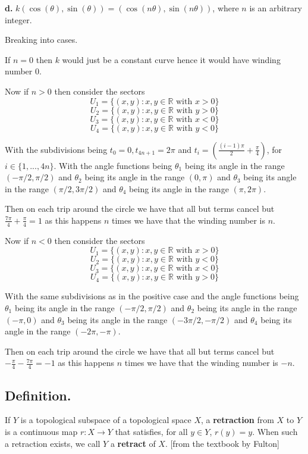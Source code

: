 \documentclass{amsart}
\theoremstyle{plain}
\theoremstyle{definition}
\theoremstyle{remark}
\begin{document}
\vspace{.1in}
{\bfseries d.} $k(\cos (\theta ), \sin (\theta )) = (\cos (n\theta ), \sin (n\theta ))$, where $n$ is an arbitrary integer.
{
    Breaking into cases. 

    If $n=0$ then $k$ would just be a constant curve hence it would have winding number $0$.

    Now if $n>0$ then consider the sectors $$U_1=\{(x,y):x,y\in \mathbb R \text{ with } x>0\}$$ $$U_2=\{(x,y):x,y\in \mathbb R \text{ with } y>0\}$$ $$U_3=\{(x,y):x,y\in \mathbb R \text{ with } x<0\}$$ $$U_4=\{(x,y):x,y\in \mathbb R \text{ with } y<0\}$$
    
    With the subdivisions being $t_0=0,t_{4n+1}=2\pi$ and $t_i=(\frac{(i-1)\pi}{2}+\frac{\pi}{4})$, for $i\in \{1,...,4n\}$. With the angle functions being $\theta_1$ being its angle in the range $(-\pi/2,\pi/2)$ and $\theta_2$ being its angle in the range $(0,\pi)$ and $\theta_3$ being its angle in the range $(\pi/2,3\pi/2)$ and $\theta_4$ being its angle in the range $(\pi,2\pi)$. 


    Then on each trip around the circle we have that all but terms cancel but $\frac{7\pi}{4}+\frac{\pi}{4}=1$
    as this happens $n$ times we have that the winding number is $n$.

    Now if $n<0$ then consider the sectors $$U_1=\{(x,y):x,y\in \mathbb{R} \text{ with }x> 0\}$$
    $$U_2=\{(x,y):x,y\in \mathbb{R} \text{ with }y<0\}$$
    $$U_3=\{(x,y):x,y\in \mathbb{R} \text{ with }x<0\}$$
    $$U_4=\{(x,y):x,y\in \mathbb{R} \text{ with }y>0\}$$

    With the same subdivisions as in the positive case and the angle functions being $\theta_1$ being its angle in the range $(-\pi/2,\pi/2)$ and $\theta_2$ being its angle in the range $(-\pi,0)$ and $\theta_3$ being its angle in the range $(-3\pi/2,-\pi/2)$ and $\theta_4$ being its angle in the range $(-2\pi,-\pi)$. 

    Then on each trip around the circle we have that all but terms cancel but $-\frac{\pi}{4}-\frac{7\pi}{4}=-1$
    as this happens $n$ times we have that the winding number is $-n$.
}


\vspace{.15in}
\subsection*{Definition.}  If $Y$ is a topological subspace of a topological space $X$, a {\bf retraction} from $X$ to $Y$ is a continuous map $r : X \to Y$ that satisfies, for all $y\in Y$, $r(y) = y$. When such a retraction exists, we call $Y$ a {\bf retract} of $X$. [from the textbook by Fulton]
\end{document}
